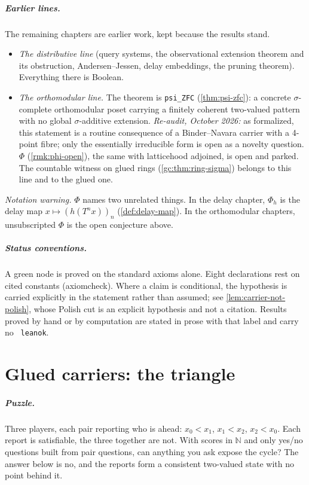 \paragraph{Earlier lines.} The remaining chapters are earlier work, kept
because the results stand.
\begin{itemize}
  \item \emph{The distributive line} (query systems, the observational
    extension theorem and its obstruction, Andersen--Jessen, delay embeddings,
    the pruning theorem). Everything there is Boolean.
  \item \emph{The orthomodular line.} The theorem is \texttt{psi\_ZFC}
    (\ref{thm:psi-zfc}): a concrete $\sigma$-complete orthomodular poset
    carrying a finitely coherent two-valued pattern with no global
    $\sigma$-additive extension. \emph{Re-audit, October 2026:} as formalized,
    this statement is a routine consequence of a Binder--Navara carrier with a
    4-point fibre; only the essentially irreducible form is open as a novelty
    question. $\Phi$ (\ref{rmk:phi-open}), the same with
    latticehood adjoined, is open and parked. The countable witness on glued
    rings (\ref{gc:thm:ring-sigma}) belongs to this line and to the glued one.
\end{itemize}

\emph{Notation warning.} $\Phi$ names two unrelated things. In the delay
chapter, $\Phi_h$ is the delay map $x \mapsto (h(T^n x))_n$
(\ref{def:delay-map}). In the orthomodular chapters, unsubscripted $\Phi$ is the
open conjecture above.

\paragraph{Status conventions.} A green node is proved on the standard axioms
alone. Eight declarations rest on cited constants (axiomcheck). Where a claim is conditional, the
hypothesis is carried explicitly in the statement rather than assumed; see
\ref{lem:carrier-not-polish}, whose Polish cut is an explicit hypothesis and not
a citation. Results proved by hand or by computation are stated in prose with
that label and carry no \texttt{ leanok}.

\chapter{Glued carriers: the triangle}
\label{chap:glued}

\paragraph{Puzzle.} Three players, each pair reporting who is ahead: $x_0<x_1$,
$x_1<x_2$, $x_2<x_0$. Each report is satisfiable, the three together are not.
With scores in $\mathbb N$ and only yes/no questions built from pair questions,
can anything you ask expose the cycle? The answer below is no, and the reports
form a consistent two-valued state with no point behind it.

